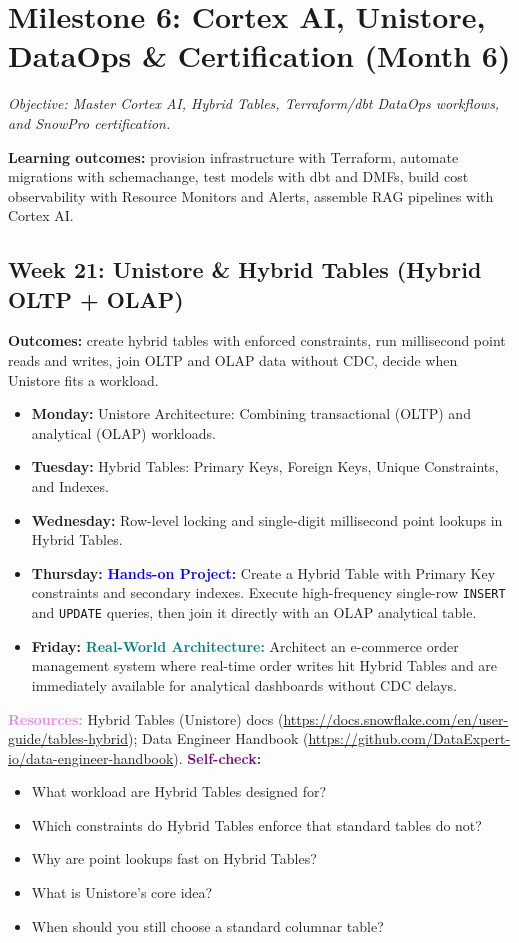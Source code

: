 \documentclass[11pt, a4paper]{article}
\newcommand{\project}[1]{\textbf{\textcolor{blue}{Hands-on Project:}} #1}
\newcommand{\usecase}[1]{\textbf{\textcolor{teal}{Real-World Architecture:}} #1}
\newcommand{\dayitem}[2]{\item \textbf{#1:} #2}
\newcommand{\resources}[1]{\vspace{1mm}\noindent\textbf{\textcolor{violet}{Resources:}} #1}
\newcommand{\selfcheck}[1]{\vspace{1mm}\noindent\textbf{\textcolor{purple}{Self-check:}} #1}
\begin{document}
\newpage
\section{Milestone 6: Cortex AI, Unistore, DataOps \& Certification (Month 6)}
\textit{Objective: Master Cortex AI, Hybrid Tables, Terraform/dbt DataOps workflows, and SnowPro certification.}
\par\noindent\textbf{Learning outcomes:} provision infrastructure with Terraform, automate migrations with schemachange, test models with dbt and DMFs, build cost observability with Resource Monitors and Alerts, assemble RAG pipelines with Cortex AI.

\subsection*{Week 21: Unistore \& Hybrid Tables (Hybrid OLTP + OLAP)}
\par\noindent\textbf{Outcomes:} create hybrid tables with enforced constraints, run millisecond point reads and writes, join OLTP and OLAP data without CDC, decide when Unistore fits a workload.
\begin{itemize}[label=-]
    \dayitem{Monday}{Unistore Architecture: Combining transactional (OLTP) and analytical (OLAP) workloads.}
    \dayitem{Tuesday}{Hybrid Tables: Primary Keys, Foreign Keys, Unique Constraints, and Indexes.}
    \dayitem{Wednesday}{Row-level locking and single-digit millisecond point lookups in Hybrid Tables.}
    \dayitem{Thursday}{\project{Create a Hybrid Table with Primary Key constraints and secondary indexes. Execute high-frequency single-row \texttt{INSERT} and \texttt{UPDATE} queries, then join it directly with an OLAP analytical table.}}
    \dayitem{Friday}{\usecase{Architect an e-commerce order management system where real-time order writes hit Hybrid Tables and are immediately available for analytical dashboards without CDC delays.}}
\end{itemize}
\resources{Hybrid Tables (Unistore) docs (\url{https://docs.snowflake.com/en/user-guide/tables-hybrid}); Data Engineer Handbook (\url{https://github.com/DataExpert-io/data-engineer-handbook}).}
\selfcheck{\begin{itemize}[label=-, nosep, leftmargin=4mm]
    \item What workload are Hybrid Tables designed for?
    \item Which constraints do Hybrid Tables enforce that standard tables do not?
    \item Why are point lookups fast on Hybrid Tables?
    \item What is Unistore's core idea?
    \item When should you still choose a standard columnar table?
\end{itemize}}
\end{document}
